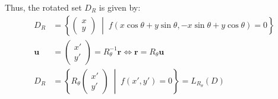 \documentclass{article}
\renewcommand{\vec}[1]{\boldsymbol{#1}}
\begin{document}
Thus, the rotated set $D_R$ is given by:
\begin{align*}
  D_R &= \left\{ \begin{pmatrix} x \\ y \end{pmatrix} \;\middle|\; f(x\cos\theta + y\sin\theta, -x\sin\theta + y\cos\theta) = 0 \right\} \\[1ex]
  \vec{u} &= \begin{pmatrix} x' \\ y' \end{pmatrix} = R_{\theta}^{-1}\vec{r} \iff \vec{r} = R_{\theta}\vec{u} \\[1ex]
  D_R &= \left\{ R_{\theta} \begin{pmatrix} x' \\ y' \end{pmatrix} \;\middle|\; f(x', y') = 0 \right\} = L_{R_{\theta}}(D)
\end{align*}
\end{document}
